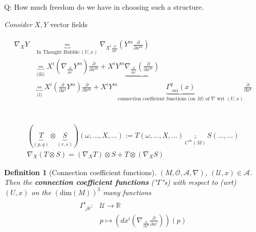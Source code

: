 \documentclass[10pt]{amsart}
\newtheorem{definition}{Definition}
\begin{document}
\begin{multicols*}{2}
Q: How much freedom do we have in choosing such a structure.

\emph{Consider} $X,Y$ vector fields

\[
\begin{gathered}
\begin{aligned} 
\nabla_XY & \underbrace{=}_{\text{In Thought Bubble:} (U,x)  } \nabla_{X^i \frac{\partial}{\partial x^i} } \left( Y^m \frac{\partial}{ \partial x^m} \right) \\
& \underbrace{=}_{\text{(iii)}} X^i \left( \nabla_{\frac{\partial}{\partial x^i} } Y^m \right) \frac{\partial}{\partial x^m} + X^i Y^m \underbrace{ \nabla_{\frac{\partial}{\partial x^i} } \left( \frac{\partial }{ \partial x^m} \right) }_{} \\
& \underbrace{=}_{\text{(i)}} X^i \left( \frac{\partial}{\partial x^i} Y^m \right) \frac{\partial}{ \partial x^m} + X^i Y^m \underbrace{\Gamma^q_{\,\, mi}(x)}_{\text{connection coefficient functions (on $M$) of $\nabla$ wrt $(U,x)$}} \frac{\partial}{\partial x^q}
\end{aligned} 
\end{gathered}
\]	

\quad \\

\[
\begin{gathered}
(\underbrace{T}_{(p,q)}\otimes \underbrace{S}_{(r,s)})(\omega, \dots, X, \dots) := T(\omega, \dots, X, \dots) \underbrace{\cdot}_{C^{\infty}(M)} S(\dots, \dots) \\
\nabla_X (T \otimes S) = (\nabla_X T) \otimes S + T\otimes (\nabla_X S)
\end{gathered}
\]

\begin{definition}[Connection coefficient functions] $(M, \mathcal{O}, \mathcal{A}, \nabla)$, $(\mathcal{U}, x) \in \mathcal{A}$. \\	
	Then the \textbf{connection coefficient functions} ("$\Gamma$"s) with respect to (wrt) $(U,x)$ on the $(\text{dim}(M))^3$ many functions
	\[
	\begin{gathered}
	\begin{aligned}
	\Gamma^i_{\, \, jk} : & \mathcal{U} \to \mathbb{R} \\ 
	& p \mapsto \left( dx^i \left( \nabla_{\frac{\partial}{\partial x^k} } \frac{\partial}{\partial x^j} \right)\right) (p) 
\end{aligned}	
	\end{gathered}
	\]
	
\end{definition} 


\end{multicols*}
\end{document}
